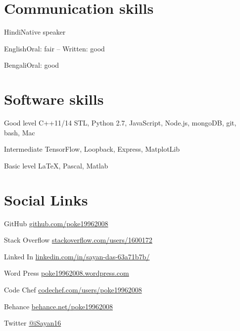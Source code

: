 \documentclass{tccv}
\begin{document}
\section{Communication skills}

\begin{factlist}
\item{Hindi}{Native speaker}
\item{English}{Oral: fair -- Written: good}
\item{Bengali}{Oral: good}
\end{factlist}

\section{Software skills}

\begin{factlist}

\item{Good level}
     {C++11/14 STL, Python 2.7, JavaScript, Node.js, mongoDB, git, bash, Mac}

\item{Intermediate}
     {TensorFlow, Loopback, Express, MatplotLib}

\item{Basic level}
     {\LaTeX, Pascal, Matlab}

\end{factlist}

\section{Social Links}

\begin{factlist}

\item{GitHub}
     {\href{https://github.com/poke19962008}{github.com/poke19962008}}
\item{Stack Overflow}
     {\href{https://stackoverflow.com/users/1600172}{stackoverflow.com/users/1600172}}
\item{Linked In}
     {\href{https://www.linkedin.com/in/sayan-das-63a71b7b/}{linkedin.com/in/sayan-das-63a71b7b/}}
\item{Word Press}
     {\href{https://poke19962008.wordpress.com}{poke19962008.wordpress.com}}
\item{Code Chef}
     {\href{https://www.codechef.com/users/poke19962008}{codechef.com/users/poke19962008}}

\item{Behance}
     {\href{https://www.behance.net/poke19962008}{behance.net/poke19962008}}
\item{Twitter}
     {\href{https://twitter.com/iSayan16}{@iSayan16}}
     

\end{factlist}
\end{document}
